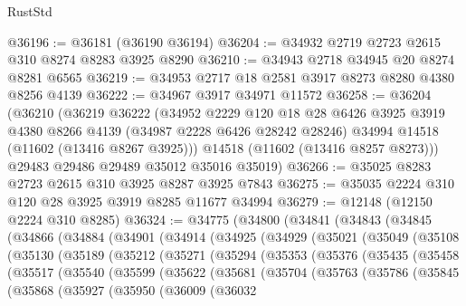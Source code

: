 \begin{lexlean}{RustStd}
\begin{coremodule}
@36196 := @36181 (@36190 @36194)
@36204 := @34932 @2719 @2723 @2615 @310 @8274 @8283 @3925 @8290
@36210 := @34943 @2718 @34945 @20 @8274 @8281 @6565
@36219 := @34953 @2717 @18 @2581 @3917 @8273 @8280 @4380 @8256 @4139
@36222 := @34967 @3917 @34971 @11572
@36258 := @36204
    (@36210
      (@36219
        @36222
        (@34952
          @2229
          @120
          @18
          @28
          @6426
          @3925
          @3919
          @4380
          @8266
          @4139
          (@34987 @2228 @6426 @28242 @28246)
          @34994
          @14518
          (@11602 (@13416 @8267 @3925)))
        @14518
        (@11602 (@13416 @8257 @8273)))
      @29483
      @29486
      @29489
      @35012
      @35016
      @35019)
@36266 := @35025 @8283 @2723 @2615 @310 @3925 @8287 @3925 @7843
@36275 := @35035 @2224 @310 @120 @28 @3925 @3919 @8285 @11677 @34994
@36279 := @12148 (@12150 @2224 @310 @8285)
@36324 := @34775
    (@34800
      (@34841
        (@34843
          (@34845
            (@34866
              (@34884
                (@34901
                  (@34914
                    (@34925
                      (@34929
                        (@35021
                          (@35049
                            (@35108
                              (@35130
                                (@35189
                                  (@35212
                                    (@35271
                                      (@35294
                                        (@35353
                                          (@35376
                                            (@35435
                                              (@35458
                                                (@35517
                                                  (@35540
                                                    (@35599
                                                      (@35622
                                                        (@35681
                                                          (@35704
                                                            (@35763
                                                              (@35786
                                                                (@35845
                                                                  (@35868
                                                                    (@35927
                                                                      (@35950
                                                                        (@36009
                                                                          (@36032

\end{coremodule}
\end{lexlean}
